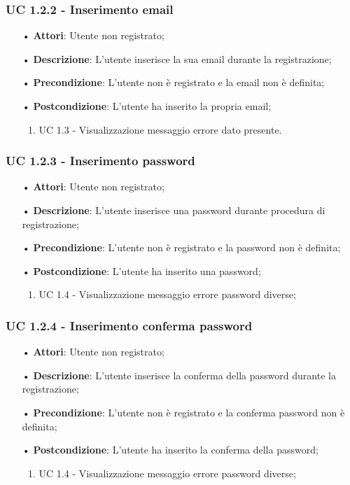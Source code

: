 \subsubsection{UC 1.2.2 - Inserimento email}
\begin{itemize}
	\item[•]\textbf{Attori}: Utente non registrato;
	\item[•]\textbf{Descrizione}: L'utente inserisce la sua email durante la registrazione;
	\item[•]\textbf{Precondizione}: L'utente non è registrato e la email non è definita;
	\item[•]\textbf{Postcondizione}: L'utente ha inserito la propria email;
		\begin{enumerate}
		\item UC 1.3 - Visualizzazione messaggio errore dato presente.
	\end{enumerate}
\end{itemize}

\subsubsection{UC 1.2.3 - Inserimento password}
\begin{itemize}
	\item[•]\textbf{Attori}: Utente non registrato;
	\item[•]\textbf{Descrizione}: L'utente inserisce una password durante procedura di registrazione;
	\item[•]\textbf{Precondizione}: L'utente non è registrato e la password non è definita;
	\item[•]\textbf{Postcondizione}: L'utente ha inserito una password;
	\begin{enumerate}
		\item UC 1.4 - Visualizzazione messaggio errore password diverse;
	\end{enumerate}
\end{itemize}

\subsubsection{UC 1.2.4 - Inserimento conferma password}
\begin{itemize}
	\item[•]\textbf{Attori}: Utente non registrato;
	\item[•]\textbf{Descrizione}: L'utente inserisce la conferma della password durante la registrazione;
	\item[•]\textbf{Precondizione}: L'utente non è registrato e la conferma password non è definita;
	\item[•]\textbf{Postcondizione}: L'utente ha inserito la conferma della password;
		\begin{enumerate}
		\item UC 1.4 - Visualizzazione messaggio errore password diverse;
	\end{enumerate}
\end{itemize}

